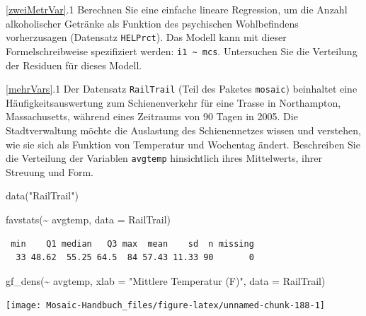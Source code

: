 \documentclass[
  ngerman,
]{scrbook}
\newenvironment{Shaded}{\begin{snugshade}}{\end{snugshade}}
\newcommand{\AttributeTok}[1]{\textcolor[rgb]{0.77,0.63,0.00}{#1}}
\newcommand{\FunctionTok}[1]{\textcolor[rgb]{0.00,0.00,0.00}{#1}}
\newcommand{\NormalTok}[1]{#1}
\newcommand{\SpecialCharTok}[1]{\textcolor[rgb]{0.00,0.00,0.00}{#1}}
\newcommand{\StringTok}[1]{\textcolor[rgb]{0.31,0.60,0.02}{#1}}
\begin{document}
\ref{zweiMetrVar}.1 Berechnen Sie eine einfache lineare Regression, um die Anzahl alkoholischer Getränke als Funktion des psychischen Wohlbefindens vorherzusagen (Datensatz \texttt{HELPrct}). Das Modell kann mit dieser Formelschreibweise spezifiziert werden: \texttt{i1\ \textasciitilde{}\ mcs}. Untersuchen Sie die Verteilung der Residuen für dieses Modell.

\ref{mehrVars}.1 Der Datensatz \texttt{RailTrail} (Teil des Paketes \texttt{mosaic}) beinhaltet eine Häufigkeitsauswertung zum Schienenverkehr für eine Trasse in Northampton, Massachusetts, während eines Zeitraums von 90 Tagen in 2005. Die Stadtverwaltung möchte die Auslastung des Schienennetzes wissen und verstehen, wie sie sich als Funktion von Temperatur und Wochentag ändert. Beschreiben Sie die Verteilung der Variablen \texttt{avgtemp} hinsichtlich ihres Mittelwerts, ihrer Streuung und Form.

\begin{Shaded}
\begin{Highlighting}[]
\FunctionTok{data}\NormalTok{(}\StringTok{"RailTrail"}\NormalTok{)}
\end{Highlighting}
\end{Shaded}

\begin{Shaded}
\begin{Highlighting}[]
\FunctionTok{favstats}\NormalTok{(}\SpecialCharTok{\textasciitilde{}}\NormalTok{ avgtemp, }\AttributeTok{data =}\NormalTok{ RailTrail)}
\end{Highlighting}
\end{Shaded}

\begin{verbatim}
 min    Q1 median   Q3 max  mean    sd  n missing
  33 48.62  55.25 64.5  84 57.43 11.33 90       0
\end{verbatim}

\begin{Shaded}
\begin{Highlighting}[]
\FunctionTok{gf\_dens}\NormalTok{(}\SpecialCharTok{\textasciitilde{}}\NormalTok{ avgtemp, }\AttributeTok{xlab =} \StringTok{"Mittlere Temperatur (F)"}\NormalTok{, }\AttributeTok{data =}\NormalTok{ RailTrail)}
\end{Highlighting}
\end{Shaded}

\begin{center}\texttt{[image: Mosaic-Handbuch\_files/figure-latex/unnamed-chunk-188-1]} \end{center}
\end{document}
